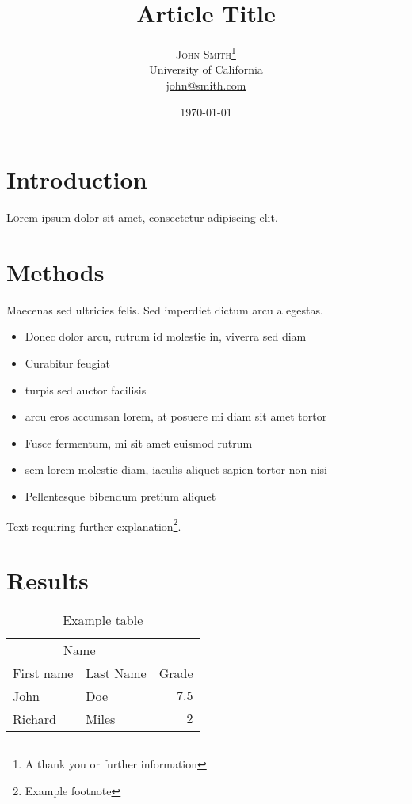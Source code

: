 \documentclass[twoside,twocolumn]{article}
\title{Article Title} %
\author{%
	\textsc{John Smith}\thanks{A thank you or further information} \\[1ex] %
	\normalsize University of California \\ %
	\normalsize \href{mailto:john@smith.com}{john@smith.com} %
}
\date{\today} %
\begin{document}
	
	\maketitle
	
	
	\section{Introduction}
	
	\lettrine[nindent=0em,lines=3]{L} orem ipsum dolor sit amet, consectetur adipiscing elit.
	\blindtext %
	
	\blindtext %
	
	
	\section{Methods}
	
	Maecenas sed ultricies felis. Sed imperdiet dictum arcu a egestas. 
	\begin{itemize}
		\item Donec dolor arcu, rutrum id molestie in, viverra sed diam
		\item Curabitur feugiat
		\item turpis sed auctor facilisis
		\item arcu eros accumsan lorem, at posuere mi diam sit amet tortor
		\item Fusce fermentum, mi sit amet euismod rutrum
		\item sem lorem molestie diam, iaculis aliquet sapien tortor non nisi
		\item Pellentesque bibendum pretium aliquet
	\end{itemize}
	\blindtext %
	
	Text requiring further explanation\footnote{Example footnote}.
	
	
	\section{Results}
	
	\begin{table}
		\caption{Example table}
		\centering
		\begin{tabular}{llr}
			\toprule
			\multicolumn{2}{c}{Name} \\
			\cmidrule(r){1-2}
			First name & Last Name & Grade \\
			\midrule
			John & Doe & $7.5$ \\
			Richard & Miles & $2$ \\
			\bottomrule
		\end{tabular}
	\end{table}
	
\end{document}
